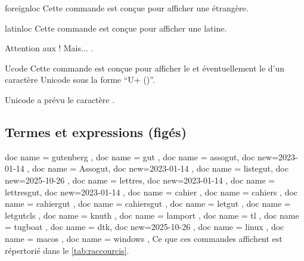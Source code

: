 \documentclass{letgut}
\begin{document}
\begin{docCommand}{foreignloc}{}
  Cette commande est conçue pour afficher une  étrangère.
\end{docCommand}

\begin{docCommand}{latinloc}{}
  Cette commande est conçue pour afficher une  latine.
\end{docCommand}

\begin{ltx-code-result}[title addon=locutions étrangères,listing options app={deletekeywords={[3]{options}}}]
Attention aux  !
Mais... .
\end{ltx-code-result}

\begin{docCommand}{Ucode}{}
  Cette commande est conçue pour afficher le  et
  éventuellement le  d'un caractère Unicode sous la forme
  \enquote{U+ ()}.
\end{docCommand}

\begin{ltx-code-result}[title addon=Point de code d'un caractère Unicode,listing options app={deletekeywords={[3]{options}}}]
Unicode a prévu le caractère .
\end{ltx-code-result}

\subsection{Termes et expressions (figés)}
\label{sec:termes}

\begin{docCommands}
  {
    { doc name = gutenberg },
    { doc name = gut },
    { doc name = assogut, doc new={2023-01-14} },
    { doc name = Assogut, doc new={2023-01-14} },
    { doc name = listegut, doc new={2025-10-26} },
    { doc name = lettres, doc new={2023-01-14} },
    { doc name = lettresgut, doc new={2023-01-14} },
    { doc name = cahier },
    { doc name = cahiers },
    { doc name = cahiergut },
    { doc name = cahiersgut },
    { doc name = letgut },
    { doc name = letgutcls },
    { doc name = knuth },
    { doc name = lamport },
    { doc name = tl },
    { doc name = tugboat },
    { doc name = dtk, doc new={2025-10-26} },
    { doc name = linux },
    { doc name = macos },
    { doc name = windows },
  }
  Ce que ces commandes affichent est répertorié dans le \vref{tab:raccourcis}.
\end{docCommands}
\end{document}
